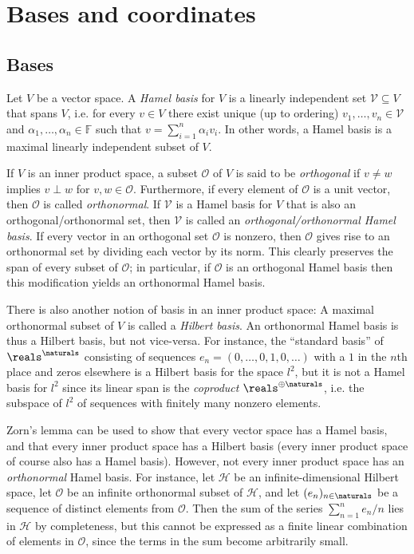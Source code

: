 \documentclass[article, a4paper, 11pt, oneside]{memoir}
\numberwithin{equation}{chapter}
\newcommand{\calV}{\mathcal{V}}
\newcommand{\calO}{\mathcal{O}}
\newcommand{\calH}{\mathcal{H}}
\newcommand{\field}{\mathbb{F}}
\begin{document}
\chapter{Bases and coordinates}

\section{Bases}

Let $V$ be a vector space. A \emph{Hamel basis} for $V$ is a linearly independent set $\calV \subseteq V$ that spans $V$, i.e. for every $v \in V$ there exist unique (up to ordering) $v_1, \ldots, v_n \in \calV$ and $\alpha_1, \ldots, \alpha_n \in \field$ such that $v = \sum_{i=1}^n \alpha_i v_i$. In other words, a Hamel basis is a maximal linearly independent subset of $V$.

If $V$ is an inner product space, a subset $\calO$ of $V$ is said to be \emph{orthogonal} if $v \neq w$ implies $v \perp w$ for $v,w \in \calO$. Furthermore, if every element of $\calO$ is a unit vector, then $\calO$ is called \emph{orthonormal}. If $\calV$ is a Hamel basis for $V$ that is also an orthogonal/orthonormal set, then $\calV$ is called an \emph{orthogonal/orthonormal Hamel basis}. If every vector in an orthogonal set $\calO$ is nonzero, then $\calO$ gives rise to an orthonormal set by dividing each vector by its norm. This clearly preserves the span of every subset of $\calO$; in particular, if $\calO$ is an orthogonal Hamel basis then this modification yields an orthonormal Hamel basis.

There is also another notion of basis in an inner product space: A maximal orthonormal subset of $V$ is called a \emph{Hilbert basis}. An orthonormal Hamel basis is thus a Hilbert basis, but not vice-versa. For instance, the \enquote{standard basis} of $\reals^\naturals$ consisting of sequences $e_n = (0,\ldots,0,1,0,\ldots)$ with a $1$ in the $n$th place and zeros elsewhere is a Hilbert basis for the space $l^2$, but it is not a Hamel basis for $l^2$ since its linear span is the \emph{coproduct} $\reals^{\oplus\naturals}$, i.e. the subspace of $l^2$ of sequences with finitely many nonzero elements.

Zorn's lemma can be used to show that every vector space has a Hamel basis, and that every inner product space has a Hilbert basis (every inner product space of course also has a Hamel basis). However, not every inner product space has an \emph{orthonormal} Hamel basis. For instance, let $\calH$ be an infinite-dimensional Hilbert space, let $\calO$ be an infinite orthonormal subset of $\calH$, and let $(e_n)_{n\in\naturals}$ be a sequence of distinct elements from $\calO$. Then the sum of the series $\sum_{n=1}^n e_n/n$ lies in $\calH$ by completeness, but this cannot be expressed as a finite linear combination of elements in $\calO$, since the terms in the sum become arbitrarily small.
\end{document}
